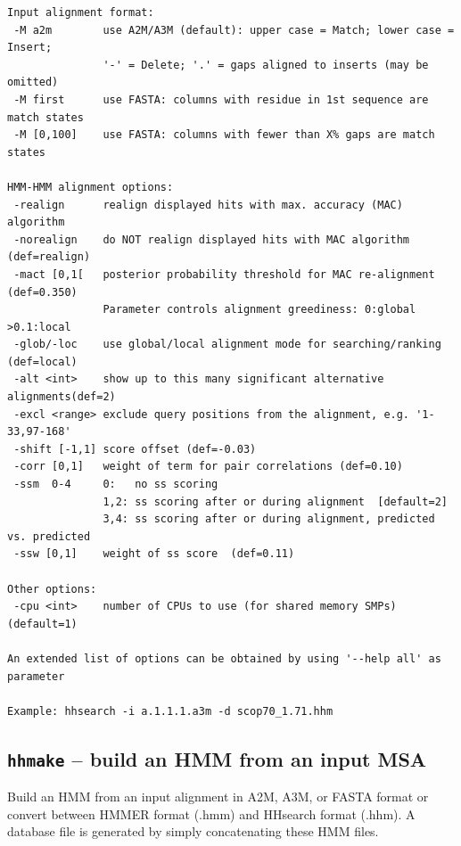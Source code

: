 \documentclass[11pt,a4paper]{article}
\begin{document}
\begin{verbatim}
Input alignment format:                                                       
 -M a2m        use A2M/A3M (default): upper case = Match; lower case = Insert;
               '-' = Delete; '.' = gaps aligned to inserts (may be omitted)   
 -M first      use FASTA: columns with residue in 1st sequence are match states
 -M [0,100]    use FASTA: columns with fewer than X% gaps are match states   

HMM-HMM alignment options:                                                    
 -realign      realign displayed hits with max. accuracy (MAC) algorithm 
 -norealign    do NOT realign displayed hits with MAC algorithm (def=realign)
 -mact [0,1[   posterior probability threshold for MAC re-alignment (def=0.350)
               Parameter controls alignment greediness: 0:global >0.1:local
 -glob/-loc    use global/local alignment mode for searching/ranking (def=local)
 -alt <int>    show up to this many significant alternative alignments(def=2)
 -excl <range> exclude query positions from the alignment, e.g. '1-33,97-168' 
 -shift [-1,1] score offset (def=-0.03)                                       
 -corr [0,1]   weight of term for pair correlations (def=0.10)                
 -ssm  0-4     0:   no ss scoring                                             
               1,2: ss scoring after or during alignment  [default=2]       
               3,4: ss scoring after or during alignment, predicted vs. predicted 
 -ssw [0,1]    weight of ss score  (def=0.11)                                

Other options:                                                                
 -cpu <int>    number of CPUs to use (for shared memory SMPs) (default=1)

An extended list of options can be obtained by using '--help all' as parameter 

Example: hhsearch -i a.1.1.1.a3m -d scop70_1.71.hhm 
\end{verbatim} 
\normalsize

\subsection{{\tt hhmake} -- build an HMM from an input MSA}

Build an HMM from an input alignment in A2M, A3M, or FASTA format  
or convert between HMMER format (.hmm) and HHsearch format (.hhm).   
A database file is generated by simply concatenating these HMM files.
\end{document}
